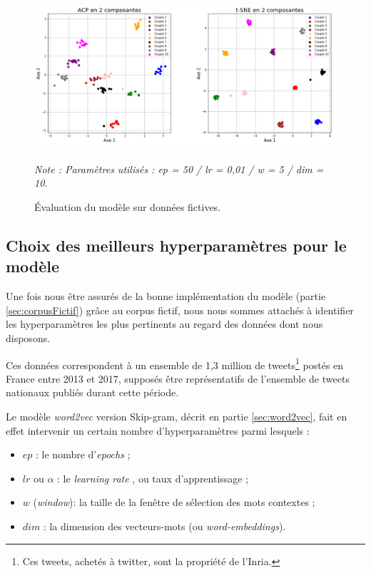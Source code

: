 \documentclass[11pt,french,french]{article}
\let\rmarkdownfootnote\footnote%
\def\footnote{\protect\rmarkdownfootnote}
\begin{document}
\begin{figure}
\begin{center}
\includegraphics[width=1\textwidth]{img/figures.png}
\captionsetup{margin=0cm,format=hang,justification=justified}
\caption{Évaluation du modèle sur données fictives.}\label{fig:figure_evaluation}
\end{center}
\vspace{-0.3cm}
\footnotesize
\emph{Note : Paramètres utilisés : ep = 50 / lr = 0,01 / w = 5 / dim = 10.}
\end{figure}

\subsection{Choix des meilleurs hyperparamètres pour le
modèle}\label{sec:hyperparametres}

Une fois nous être assurés de la bonne implémentation du modèle (partie
\ref{sec:corpusFictif}) grâce au corpus fictif, nous nous sommes
attachés à identifier les hyperparamètres les plus pertinents au regard
des données dont nous disposons.

Ces données correspondent à un ensemble de 1,3 million de
tweets\footnote{Ces tweets, achetés à twitter, sont la propriété de
  l'Inria.} postés en France entre 2013 et 2017, supposés être
représentatifs de l'ensemble de tweets nationaux publiés durant cette
période.

Le modèle \emph{word2vec} version Skip-gram, décrit en partie
\ref{sec:word2vec}, fait en effet intervenir un certain nombre
d'hyperparamètres parmi lesquels :

\begin{itemize}
\item $ep$ : le nombre d'\og \emph{epochs} \fg{} ;
\item $lr$ ou $\alpha$ : le \og \emph{learning rate} \fg, ou taux d'apprentissage ;
\item $w$ (\emph{window}): la taille de la fenêtre de sélection des mots contextes ;
\item $dim$ : la dimension des vecteurs-mots (ou \emph{word-embeddings}).
\end{itemize}
\end{document}
